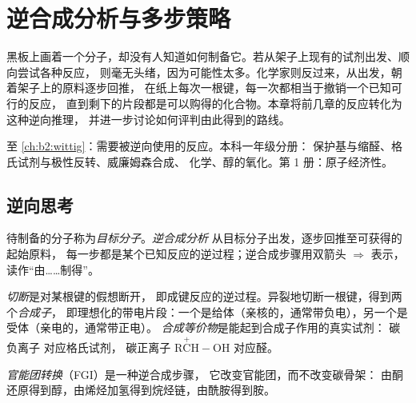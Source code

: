 \chapter{逆合成分析与多步策略}\label{ch:b2:retrosynthesis}

黑板上画着一个分子，却没有人知道如何制备它。若从架子上现有的试剂出发、顺向尝试各种反应，
则毫无头绪，因为可能性太多。化学家则反过来，从出发，朝着架子上的原料逐步回推，
在纸上每次一根键，每一次都相当于撤销一个已知可行的反应，
直到剩下的片段都是可以购得的化合物。本章将前几章的反应转化为这种逆向推理，
并进一步讨论如何评判由此得到的路线。

\begin{recall}
 至 \cref{ch:b2:wittig}：需要被逆向使用的反应。本科一年级分册：
保护基与缩醛、格氏试剂与极性反转、威廉姆森合成、
化学、醇的氧化。第 1 册：原子经济性。
\end{recall}

\section{逆向思考}

\begin{definition}[逆合成分析]\label{def:b2:retrosynthesis:analysis}
待制备的分子称为\emph{目标分子}。\emph{逆合成分析}
从目标分子出发，逐步回推至可获得的起始原料，
每一步都是某个已知反应的逆过程；逆合成步骤用双箭头 $\Rightarrow$ 表示，
读作“由……制得”。
\end{definition}

\begin{definition}[切断与合成子]\label{def:b2:retrosynthesis:disconnection}
\emph{切断}是对某根键的假想断开，
即成键反应的逆过程。异裂地切断一根键，得到两个\emph{合成子}，
即理想化的带电片段：一个是给体（亲核的，通常带负电），另一个是受体（亲电的，通常带正电）。
\emph{合成等价物}是能起到合成子作用的真实试剂：
碳负离子  对应格氏试剂，
碳正离子 $\mathrm{R\overset{+}{C}H{-}OH}$ 对应醛。
\end{definition}

\begin{definition}[官能团转换]\label{def:b2:retrosynthesis:fgi}
\emph{官能团转换}（FGI）是一种逆合成步骤，
它改变官能团，而不改变碳骨架：
由酮还原得到醇，由烯烃加氢得到烷烃链，由酰胺得到胺。
\end{definition}

